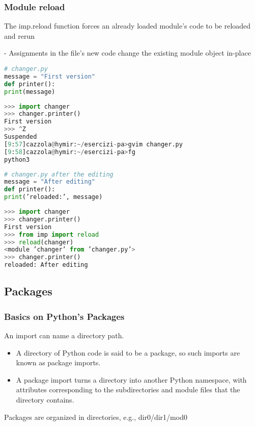 \subsubsection{Module reload}

The imp.reload function forces an already loaded module’s code to be reloaded and rerun

- Assignments in the file’s new code change the existing module object in-place

\begin{lstlisting}[language=Python]
# changer.py
message = "First version"
def printer():
print(message)
\end{lstlisting}

\begin{lstlisting}[language=Python]
>>> import changer
>>> changer.printer()
First version
>>> ^Z
Suspended
[9:57]cazzola@hymir:~/esercizi-pa>gvim changer.py
[9:58]cazzola@hymir:~/esercizi-pa>fg
python3
\end{lstlisting}

\begin{lstlisting}[language=Python]
# changer.py after the editing
message = "After editing"
def printer():
print(’reloaded:’, message)
\end{lstlisting}

\begin{lstlisting}[language=Python]
>>> import changer
>>> changer.printer()
First version
>>> from imp import reload
>>> reload(changer)
<module ’changer’ from ’changer.py’>
>>> changer.printer()
reloaded: After editing
\end{lstlisting}

\subsection{Packages}

\subsubsection{Basics on Python’s Packages}

An import can name a directory path.
\begin{itemize}
  \item A directory of Python code is said to be a package, so such imports are known as package imports.
  \item A package import turns a directory into another Python namespace, with attributes corresponding to the subdirectories and module files that the directory contains. 
\end{itemize}

Packages are organized in directories, e.g., dir0/dir1/mod0

























